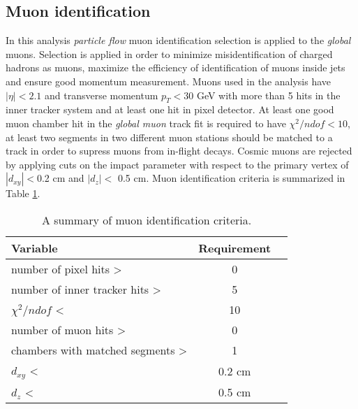 
\subsection{Muon identification}

In this analysis \textit{particle flow} muon identification selection is applied to the \textit{global} muons. Selection is applied in order to minimize misidentification of charged hadrons as muons, maximize the efficiency of identification of muons inside jets and ensure good momentum measurement. Muons used in the analysis have $|\eta|<2.1$ and transverse momentum $p_T<30$ GeV with more than 5 hits in the inner tracker system and at least one hit in pixel detector. At least one good muon chamber hit in the \textit{global muon} track fit is required to have $\chi^2/ndof<10$, at least two segments in two different muon stations should be matched to a track in order to supress muons from in-flight decays. Cosmic muons are rejected by applying cuts on the impact parameter with respect to the primary vertex of $|d_{xy}|<$0.2 cm and $|d_z|<$ 0.5 cm. Muon identification criteria is summarized in Table \ref{tab:muID}.

  \begin{table}[h]
\centering
  \caption{A summary of muon identification criteria.}
  \label{tab:muID}
  \begin{tabular}{ l  c c}
      \hline
      \hline
      	Variable & Requirement \\
      	\hline
    		number of pixel hits > &  0 \\
     	number of inner tracker hits > &  5 \\
     	$\chi^2/ndof$ < & 10 \\
		number of muon hits > & 0  \\
		chambers with matched segments > & 1  \\		
		$d_{xy}$ < & 0.2 cm \\
		$d_{z}$ <  & 0.5 cm \\
      \hline
      \hline 
  \end{tabular}
\end{table}
 


